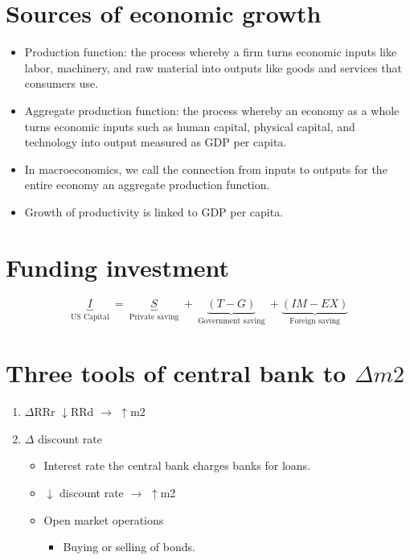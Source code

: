 \documentclass[openany]{book}
\begin{document}
\section{Sources of economic growth}
\begin{itemize}
    \item Production function: the process whereby a firm turns economic inputs like labor, machinery, and raw material into outputs like goods and services that consumers use.
    \item Aggregate production function: the process whereby an economy as a whole turns economic inputs such as human capital, physical capital, and technology into output measured as GDP per capita. 
    \item In macroeconomics, we call the connection from inputs to outputs for the entire economy an aggregate production function.
    \item Growth of productivity is linked to GDP per capita.
\end{itemize}

\section{Funding investment}
\[
  \underbrace{I}_{\text{ US Capital }} = \underbrace{S}_{\text{ Private saving }} + \underbrace{(T-G)}_{\text{ Government saving }} + \underbrace{(IM-EX)}_{\text{ Foreign saving }}
\]

\section{Three tools of central bank to $\Delta m2$ }
\begin{enumerate}
    \item $\Delta$RRr $\downarrow$RRd $\rightarrow$ $\uparrow $m2
    \item $\Delta$ discount rate 
        \begin{itemize}
            \item Interest rate the central bank charges banks for loans. 
            \item $\downarrow $ discount rate $\rightarrow$ $\uparrow $m2
            \item Open market operations 
                \begin{itemize}
                    \item Buying or selling of bonds.
                \end{itemize}
        \end{itemize}
\end{enumerate}
\end{document}
